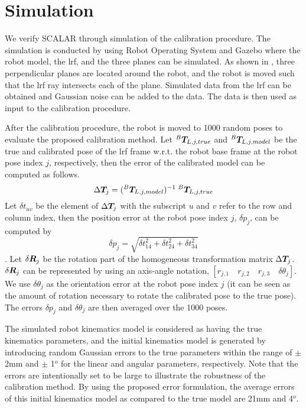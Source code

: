 \section{Simulation}
\label{sec:simulation}

We verify SCALAR through simulation of the calibration procedure. The simulation is conducted by using Robot Operating System and Gazebo where the robot model, the \ac{lrf}, and the three planes can be simulated.  
As shown in , three perpendicular planes are located around the robot, and the robot is moved such that the \ac{lrf} ray intersects each of the plane. Simulated data from the \ac{lrf} can be obtained and Gaussian noise can be added to the data. The data is then used as input to the calibration procedure. 

After the calibration procedure, the robot is moved to 1000 random poses to evaluate the proposed calibration method. Let ${^B}\vb*{T}_{L,j,true}$ and ${^B}\vb*{T}_{L,j,model}$ be the true and calibrated pose of the \ac{lrf} frame w.r.t. the robot base frame at the robot pose index $j$, respectively, then the error of the calibrated model can be computed as follows. 
\begin{equation}
\Delta \vb*{T}_j =  ({^B}\vb*{T}_{L,j,model})^{-1} \; {^B}\vb*{T}_{L,j,true}
\end{equation}
Let $\delta t_{uv}$ be the element of $\Delta \vb*{T}_j$ with the subscript $u$ and $v$ refer to the row and column index, then the position error at the robot pose index $j$, $\delta p_j$, can be computed by
\begin{equation}
\delta p_j = \sqrt{\delta t_{14}^2 + \delta t_{24}^2 + \delta t_{34}^2}
\end{equation}.
Let $\delta \vb*{R}_j$ be the rotation part of the homogeneous transformation matrix $\Delta \vb*{T}_j$. $\delta \vb*{R}_j$ can be represented by using an axis-angle notation, $[r_{j,1}\quad r_{j,2}\quad r_{j,3}\quad \delta \theta_j]$. We use $\delta\theta_j$ as the orientation error at the robot pose index $j$ (it can be seen as the amount of rotation necessary to rotate the calibrated pose to the true pose). The errors $\delta p_j$ and $\delta\theta_j$ are then averaged over the 1000 poses. 

The simulated robot kinematics model is considered as having the true kinematics parameters, and the initial kinematics model is generated by introducing random Gaussian errors to the true parameters within the range of $\pm$ 2mm and $\pm$ 1$^o$ for the linear and angular parameters, respectively. Note that the errors are intentionally set to be large to illustrate the robustness of the calibration method. By using the proposed error formulation, the average errors of this initial kinematics model as compared to the true model are 21mm and 4$^o$.


